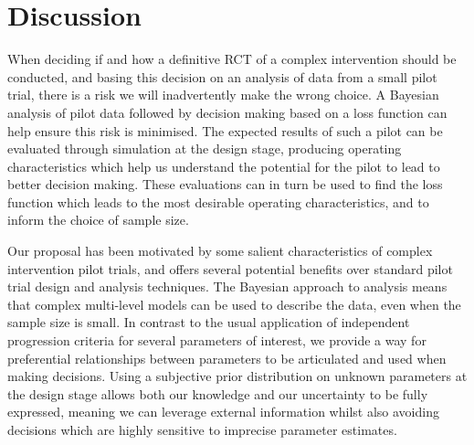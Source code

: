 \documentclass[AMA,STIX1COL]{WileyNJD-v2}
\begin{document}
\section{Discussion}\label{sec:discussion}




When deciding if and how a definitive RCT of a complex intervention should be conducted, and basing this decision on an analysis of data from a small pilot trial, there is a risk we will inadvertently make the wrong choice. A Bayesian analysis of pilot data followed by decision making based on a loss function can help ensure this risk is minimised. The expected results of such a pilot can be evaluated through simulation at the design stage, producing operating characteristics which help us understand the potential for the pilot to lead to better decision making. These evaluations can in turn be used to find the loss function which leads to the most desirable operating characteristics, and to inform the choice of sample size.

Our proposal has been motivated by some salient characteristics of complex intervention pilot trials, and offers several potential benefits over standard pilot trial design and analysis techniques. The Bayesian approach to analysis means that complex multi-level models can be used to describe the data, even when the sample size is small. In contrast to the usual application of independent progression criteria for several parameters of interest, we provide a way for preferential relationships between parameters to be articulated and used when making decisions. Using a subjective prior distribution on unknown parameters at the design stage allows both our knowledge and our uncertainty to be fully expressed, meaning we can leverage external  information whilst also avoiding decisions which are highly sensitive to imprecise parameter estimates.
\end{document}
